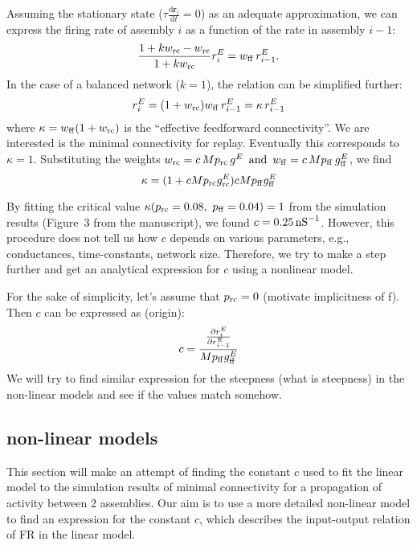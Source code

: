   Assuming the stationary state ($\tau \frac{\text{d}\boldsymbol{r}_{i}}{\text{d}t} =0$) as an adequate approximation, we can express the firing rate of assembly $i$ as a function of the rate in assembly $i-1$:
  \[\frac{1+kw_{\rm rc}-w_{\rm rc}}{1+kw_{\rm rc}} r_{i}^E = w_{\rm ff} \, r_{i-1}^E .\]
  In the case of a balanced network ($k=1$), the relation can be simplified further:
  \begin{equation}
  r_{i}^E  = (1+w_{\rm rc})w_{\rm ff} \, r_{i-1}^E = \kappa\, r_{i-1}^E
    \label{eq:EI_coupled2}
  \end{equation}
  where $\kappa = w_{\rm ff}(1+w_{\rm rc})$ is the ``effective feedforward connectivity''.
  We are interested is the minimal connectivity for replay. Eventually this corresponds to $\kappa=1$.
  Substituting the weights $w_{\rm rc} = c \, M p_{\rm rc} \, g^E \,\text{      and      } \, w_{ \rm ff} = c \, M p_{\rm ff} \, g_{\rm ff}^{E}$, we find
  \begin{equation}
    \kappa  = (1 + cMp_{\rm rc}g_{\rm rc}^E) cMp_{\rm ff}g_{\rm ff}^E 
    \label{eq:EI_coupled3}
  \end{equation}


  By fitting the critical value $\kappa(p_{\rm rc}=0.08,~p_{\rm ff}=0.04)=1$ from the simulation results (Figure~3 from the manuscript), we found $c = 0.25 \, {\rm nS}^{-1}$.
  However, this procedure does not tell us how $c$ depends on various parameters, e.g., conductances, time-constants, network size.
  Therefore, we try to make a step further and get an analytical expression for $c$ using a nonlinear model.

  For the sake of simplicity, let's assume that $p_{\rm rc}=0$ (motivate implicitness of f).
  Then $c$ can be expressed as (origin): 
  \[
    c = \frac{\frac{\partial r_i^E}{\partial r_{i-1}^{E}}} {Mp_{\rm ff}g_{\rm ff}^E }
  \]
  We will try to find similar expression for the steepness (what is steepness) in the non-linear models and see if the values match somehow.
  
  
\subsection{non-linear models}

This section will make an attempt of finding the constant $c$ used to fit the linear model to the simulation results of minimal connectivity for a propagation of activity between 2 assemblies.
Our aim is to use a more detailed non-linear model to find an expression for the constant $c$, which describes the input-output relation of FR in the linear model.

